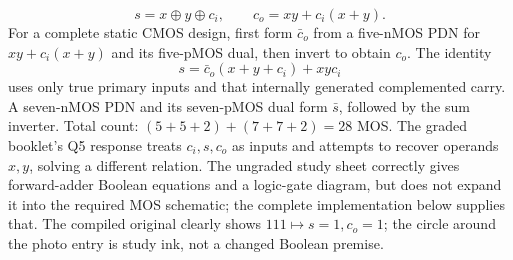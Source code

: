 \documentclass[10pt]{article}
\begin{document}
\[\boxed{s=x\oplus y\oplus c_i,\qquad c_o=xy+c_i(x+y).}\]
For a complete static CMOS design, first form $\bar c_o$ from a five-nMOS PDN for $xy+c_i(x+y)$ and its five-pMOS dual, then invert to obtain $c_o$. The identity
\[s=\bar c_o(x+y+c_i)+xyc_i\]
uses only true primary inputs and that internally generated complemented carry. A seven-nMOS PDN and its seven-pMOS dual form $\bar s$, followed by the sum inverter. Total count: $(5+5+2)+(7+7+2)=28$ MOS.
The graded booklet's Q5 response treats $c_i,s,c_o$ as inputs and attempts to recover operands $x,y$, solving a different relation. The ungraded study sheet correctly gives forward-adder Boolean equations and a logic-gate diagram, but does not expand it into the required MOS schematic; the complete implementation below supplies that. The compiled original clearly shows $111\mapsto s=1,c_o=1$; the circle around the photo entry is study ink, not a changed Boolean premise.
\newpage
\end{document}
